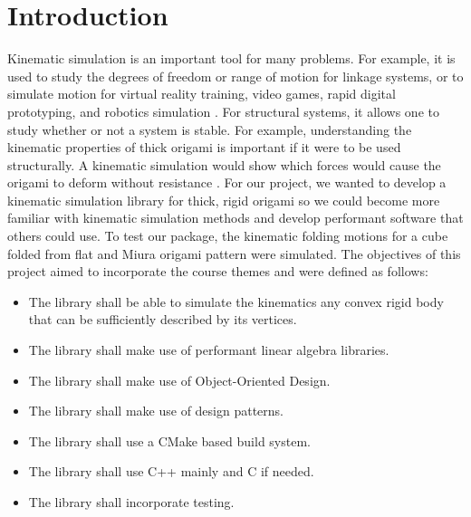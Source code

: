 \newpage
\section{Introduction}
Kinematic simulation is an important tool for many problems. For example, it is used to study the degrees of freedom or range of motion for linkage systems, or to simulate motion for virtual reality training, video games, rapid digital prototyping, and robotics simulation \cite{SiggraphContact22}.
For structural systems, it allows one to study whether or not a system is stable. For example, understanding the kinematic properties of thick origami is important if it were to be used structurally. A kinematic simulation would show which forces would cause the origami to deform without resistance \cite{filipov2015toward}. 
For our project, we wanted to develop a kinematic simulation library for thick, rigid origami so we could become more familiar with kinematic simulation methods and develop performant software that others could use. To test our package, the kinematic folding motions for a cube folded from flat and Miura origami pattern were simulated. The objectives of this project aimed to incorporate the course themes and were defined as follows: 
\begin{itemize}
    \item The library shall be able to simulate the kinematics any convex rigid body that can be sufficiently described by its vertices.
    \item The library shall make use of performant linear algebra libraries.
    \item The library shall make use of Object-Oriented Design.
    \item The library shall make use of design patterns.
    \item The library shall use a CMake based build system.
    \item The library shall use C++ mainly and C if needed.
    \item The library shall incorporate testing.

\end{itemize}


